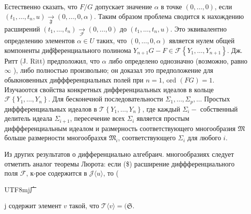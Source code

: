 \documentclass[10pt]{article}
\begin{document}
Естественно сказать, что $F / G$ допускает значение $\alpha$ в точке $(0, \ldots, 0)$, если $\left(t_{1}, \ldots, t_{n}, u\right) \underset{\mathfrak{F}}{\rightarrow}(0, \ldots, 0, \alpha)$. Таким образом проблема сводится к нахождению расширений $\left(t_{1}, \ldots, t_{n}\right) \underset{\mathcal{F}}{\rightarrow}(0, \ldots, 0)$ до $\left(t_{1}, \ldots, t_{n}, u\right)$. Это эквивалентно определению элементов $\alpha \in U$ таких, что $(0, \ldots, 0, \alpha)$ является нулем общей компоненты диф̆ференциального полинома $Y_{n+1} G-F \in \mathcal{F}\left\{Y_{1}, \ldots, Y_{n+1}\right\}$. Дж. Ритт (J. Ritt) предположил, что $\alpha$ либо определено однозначно (возможно, равно $\infty$ ), либо полностью произвольно; он доказал это предположение для обыкновенных диффференциальных полей при $n=1$, ord $(F G)=1$. Изучаоотся свойства конкретных дифференциальных идеалов в кольце $\mathscr{F}\left\{Y_{1}, \ldots, Y_{n}\right\}$. Для бесконечной последовательности $\Sigma_{1}, \ldots, \Sigma_{p}, \ldots$ Простых диффференциальных идеалов в $\mathscr{\mathcal { T }}\left\{Y_{1}, \ldots, Y_{n}\right\}$, где каждый $\Sigma_{i}-$ собственный делитель идеала $\Sigma_{i+1}$, пересечение всех $\Sigma_{i}$ является простым диффференциальным идеалом и размерность соответствующего многообразия $\mathfrak{M}$ больше размерности многообразхя $\mathfrak{M}_{i}$, соответствующего $\Sigma_{i}$ для любого $i$.



Из других результатов о дифференциально алгебраич. многообразиях следует отметить аналог теоремы Люрота: если (\$) расширение диффференциального поля $\mathscr{F}$, к-рое содержится в $\mathscr{J}\langle u\rangle$, то (\begin{CJK}{UTF8}{mj}广\end{CJK}j содержит элемент $v$ такой, что $\mathcal{T}\langle v\rangle=(\mathfrak{S}$.
\end{document}
